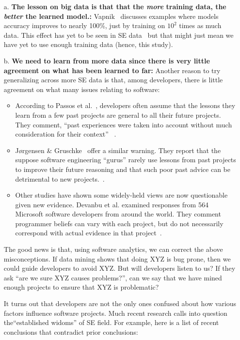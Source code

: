 \documentclass[sigconf]{acmart}
\newcommand{\bi}{\begin{itemize}[leftmargin=0.4cm]}
\newcommand{\ei}{\end{itemize}}
\theoremstyle{break}
\begin{document}
\begin{enumerate}

\item[a.] \textbf{The lesson on big data is that that the {\em more} training data, the {\em better} the learned model.:} Vapnik~\cite{vapnik14} discusses examples where models accuracy improves to nearly 100\%, just by training on $10^2$ times as much data. This effect has yet to be seen in SE data~\cite{menzies2013guest} but that might just mean we have yet to use enough training data (hence, this study). 

\item[b.] \textbf{We need to learn from more data since there is very little agreement on what has been learned to far:} Another reason to try generalizing across more SE data is that, among developers, there is little agreement on what many issues relating to software:
\bi
    \item
    According to Passos et al.~\cite{passos11},  developers often  assume that the lessons they learn from a few past projects are general to all their future projects. They comment, ``past experiences were taken into account without much consideration for their context'' ~\cite{passos11}. 
	\item
	J{\o}rgensen \& Gruschke~\cite{Jo09} offer a similar warning. They report that the suppose software engineering ``gurus'' rarely use lessons from past projects to improve their future reasoning and that such poor past advice can be detrimental to new projects.~\cite{Jo09}.
    \item 
    Other studies have shown some widely-held views are   now questionable given new evidence. Devanbu et al. examined responses from 564 Microsoft software developers from around
	the world. They comment programmer beliefs can vary with each project, but do not necessarily
	correspond with actual evidence in that project~\cite{De16}. 
\ei
	
The good news is that, using software analytics, we can correct the above misconceptions. If data mining shows that doing  XYZ is bug prone, then we could  guide developers to avoid XYZ. But will developers listen to us? If they ask ``are we sure  XYZ causes problems?'', can we say that we have mined enough projects to ensure that XYZ is problematic? 

It turns out that developers are not the only ones confused about how various factors influence software projects. Much recent research calls into question  the``established widoms'' of SE field. For example, here is a list of recent conclusions that contradict prior conclusions:


\end{enumerate}
\end{document}
